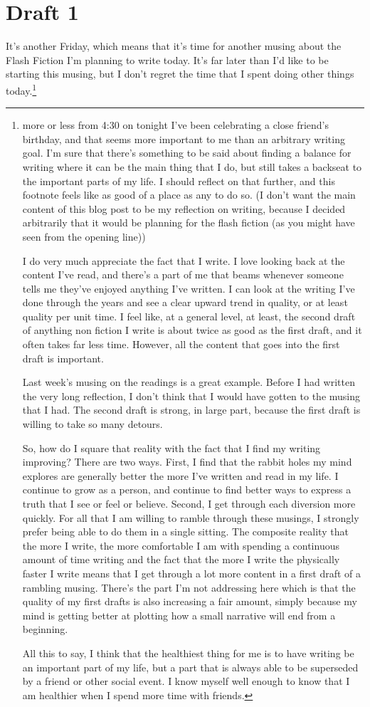 \documentclass[12pt]{article}[titlepage]
\newcommand{\1}{\={a}}
\newcommand{\2}{\={e}}
\newcommand{\3}{\={\i}}
\newcommand{\4}{\=o}
\newcommand{\5}{\=u}
\newcommand{\6}{\={A}}
\renewcommand{\,}{\textsuperscript{,}}
\begin{document}
\section{Draft 1}
It's another Friday, which means that it's time for another musing about the Flash Fiction I'm planning to write today.
It's far later than I'd like to be starting this musing, but I don't regret the time that I spent doing other things today.\footnote{more or less from 4:30 on tonight I've been celebrating a close friend's birthday, and that seems more important to me than an arbitrary writing goal.
I'm sure that there's something to be said about finding a balance for writing where it can be the main thing that I do, but still takes a backseat to the important parts of my life.
I should reflect on that further, and this footnote feels like as good of a place as any to do so. (I don't want the main content of this blog post to be my reflection on writing, because I decided arbitrarily that it would be planning for the flash fiction (as you might have seen from the opening line))

I do very much appreciate the fact that I write.
I love looking back at the content I've read, and there's a part of me that beams whenever someone tells me they've enjoyed anything I've written.
I can look at the writing I've done through the years and see a clear upward trend in quality, or at least quality per unit time.
I feel like, at a general level, at least, the second draft of anything non fiction I write is about twice as good as the first draft, and it often takes far less time.
However, all the content that goes into the first draft is important.

Last week's musing on the readings is a great example.
Before I had written the very long reflection, I don't think that I would have gotten to the musing that I had.
The second draft is strong, in large part, because the first draft is willing to take so many detours.

So, how do I square that reality with the fact that I find my writing improving?
There are two ways.
First, I find that the rabbit holes my mind explores are generally better the more I've written and read in my life.
I continue to grow as a person, and continue to find better ways to express a truth that I see or feel or believe.
Second, I get through each diversion more quickly.
For all that I am willing to ramble through these musings, I strongly prefer being able to do them in a single sitting.
The composite reality that the more I write, the more comfortable I am with spending a continuous amount of time writing and the fact that the more I write the physically faster I write means that I get through a lot more content in a first draft of a rambling musing.
There's the part I'm not addressing here which is that the quality of my first drafts is also increasing a fair amount, simply because my mind is getting better at plotting how a small narrative will end from a beginning.

All this to say, I think that the healthiest thing for me is to have writing be an important part of my life, but a part that is always able to be superseded by a friend or other social event.
I know myself well enough to know that I am healthier when I spend more time with friends.}
\end{document}
